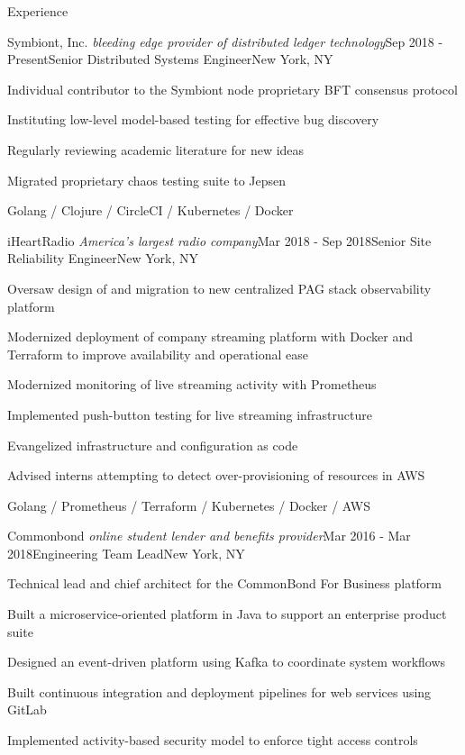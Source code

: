 \documentclass{resume} %
\begin{document}
\begin{rSection}{Experience}

\begin{rSubsection}{Symbiont, Inc. \textit{\scriptsize bleeding edge provider of distributed ledger technology}}{Sep 2018 - Present}{Senior Distributed Systems Engineer}{New York, NY}
\item Individual contributor to the Symbiont node proprietary BFT consensus protocol
\item Instituting low-level model-based testing for effective bug discovery
\item Regularly reviewing academic literature for new ideas
\item Migrated proprietary chaos testing suite to Jepsen

Golang / Clojure / CircleCI / Kubernetes / Docker
\end{rSubsection}


\begin{rSubsection}{iHeartRadio \textit{\scriptsize America's largest radio company}}{Mar 2018 - Sep 2018}{Senior Site Reliability Engineer}{New York, NY}
\item Oversaw design of and migration to new centralized PAG stack observability platform
\item Modernized deployment of company streaming platform with Docker and Terraform to improve availability and operational ease
\item Modernized monitoring of live streaming activity with Prometheus
\item Implemented push-button testing for live streaming infrastructure
\item Evangelized infrastructure and configuration as code
\item Advised interns attempting to detect over-provisioning of resources in AWS

Golang / Prometheus / Terraform / Kubernetes / Docker / AWS
\end{rSubsection}


\begin{rSubsection}{Commonbond \textit{\scriptsize online student lender and benefits provider}}{Mar 2016 - Mar 2018}{Engineering Team Lead}{New York, NY}
\item Technical lead and chief architect for the CommonBond For Business platform
\item Built a microservice-oriented platform in Java to support an enterprise product suite
\item Designed an event-driven platform using Kafka to coordinate system workflows
\item Built continuous integration and deployment pipelines for web services using GitLab
\item Implemented activity-based security model to enforce tight access controls


\end{rSubsection}
\end{rSection}
\end{document}
